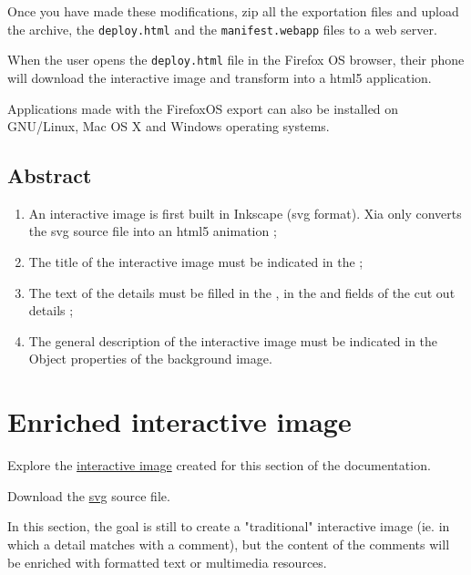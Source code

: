 Once you have made these modifications, zip all the exportation files and upload the archive, 
the \texttt{deploy.html} and the \texttt{manifest.webapp} files to a web server.

When the user opens the \texttt{deploy.html} file in the Firefox OS browser, their phone will download 
the interactive image and transform into a html5 application.

\begin{tip}
 Applications made with the FirefoxOS export can also be installed on GNU/Linux, Mac OS X and Windows operating systems.
\end{tip}


\subsection{Abstract}

\begin{enumerate}
 \item An interactive image is first built in Inkscape (svg format). Xia only 
 converts the svg source file into an html5 animation ;
 \item The title of the interactive image must be indicated in the  ;
 \item The text of the details must be filled in the , 
 in the  and  fields of the cut out details ;
 \item The general description of the interactive image must be indicated in the \softmenu
{Object properties} of the background image.
\end{enumerate}

\section{Enriched interactive image}\label{enriched_IA}

\begin{links}
Explore the \href{http://xia.dane.ac-versailles.fr/demo/tuto/xia2}{interactive image} created for this section of the documentation.

Download the \href{http://xia.dane.ac-versailles.fr/demo/tuto/xia2/svg/xia2.svg}{svg} source file.
\end{links}

In this section, the goal is still to create a "traditional" interactive image 
(ie. in which a detail matches with a comment), but the content of the comments 
will be enriched with  formatted text or multimedia resources.


